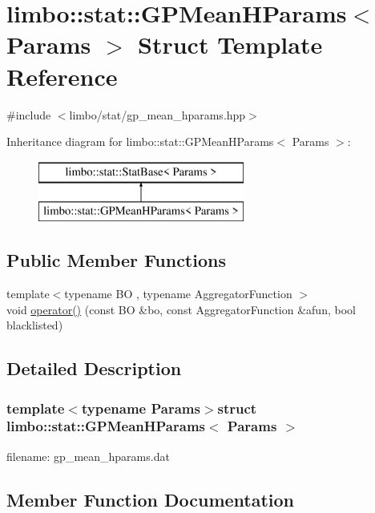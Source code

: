 \hypertarget{structlimbo_1_1stat_1_1_g_p_mean_h_params}{}\section{limbo\+:\+:stat\+:\+:G\+P\+Mean\+H\+Params$<$ Params $>$ Struct Template Reference}
\label{structlimbo_1_1stat_1_1_g_p_mean_h_params}


{\ttfamily \#include $<$limbo/stat/gp\+\_\+mean\+\_\+hparams.\+hpp$>$}

Inheritance diagram for limbo\+:\+:stat\+:\+:G\+P\+Mean\+H\+Params$<$ Params $>$\+:\begin{figure}[H]
\begin{center}
\leavevmode
\includegraphics[height=2.000000cm]{structlimbo_1_1stat_1_1_g_p_mean_h_params}
\end{center}
\end{figure}
\subsection*{Public Member Functions}
\begin{DoxyCompactItemize}
\item 
{\footnotesize template$<$typename B\+O , typename Aggregator\+Function $>$ }\\void \hyperlink{structlimbo_1_1stat_1_1_g_p_mean_h_params_ad2134995c9916a1474d2491e83950139}{operator()} (const B\+O \&bo, const Aggregator\+Function \&afun, bool blacklisted)
\end{DoxyCompactItemize}


\subsection{Detailed Description}
\subsubsection*{template$<$typename Params$>$struct limbo\+::stat\+::\+G\+P\+Mean\+H\+Params$<$ Params $>$}

filename\+: {\ttfamily gp\+\_\+mean\+\_\+hparams.\+dat} 

\subsection{Member Function Documentation}
\hypertarget{structlimbo_1_1stat_1_1_g_p_mean_h_params_ad2134995c9916a1474d2491e83950139}{}
